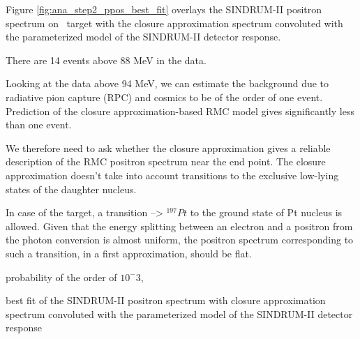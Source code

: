 Figure \ref{fig:ana_step2_ppos_best_fit} overlays the SINDRUM-II positron spectrum on
\ target with the closure approximation spectrum convoluted with the 
parameterized model of the SINDRUM-II detector response.

There are 14 events above 88 MeV in the data.

Looking at the data above 94 MeV, we can estimate the background due to radiative
pion capture (RPC) and cosmics to be of the order of one event.
Prediction of the closure approximation-based RMC model gives significantly less
than one event.

We therefore need to ask whether the closure approximation gives a reliable
description of the RMC positron spectrum near the end point. The closure approximation
doesn't take into account transitions to the exclusive low-lying states of the daughter
nucleus.

In case of the  target, a transition  --> $^{197}Pt$ to
the ground state of Pt nucleus is allowed. Given that the energy splitting between
an electron and a positron from the photon conversion is almost uniform,
the positron spectrum corresponding to such a transition, in a first approximation,
should be flat. 

probability of the order of $10^-3$, 

\vspace{0.1in}
 {
  \label{fig:ana_step2_ppos_best_fit}
  best fit of the SINDRUM-II positron spectrum with closure approximation spectrum 
  convoluted with the parameterized model of the SINDRUM-II detector response
}
\vspace{0.1in}

